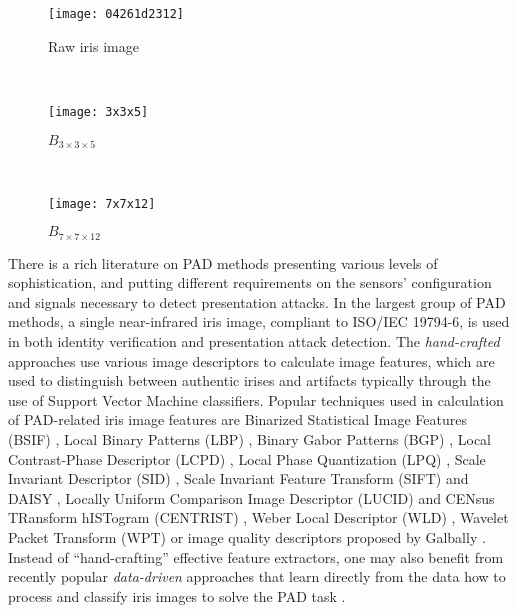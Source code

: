 %
\begin{figure*}[!tb]
    \begin{subfigure}[b]{0.32\linewidth}
            \texttt{[image: 04261d2312]}
        \caption{Raw iris image}
        \label{fig:origimg}
    \end{subfigure}
    ~
    \begin{subfigure}[b]{0.32\linewidth}
        \texttt{[image: 3x3x5]}
        \caption{$B_{3\times 3 \times 5}$}
        \label{fig:bsif3x3}
    \end{subfigure}
    ~
    \begin{subfigure}[b]{0.32\linewidth}
        \centering
        \texttt{[image: 7x7x12]}
        \caption{$B_{7\times 7 \times 12}$}
        \label{fig:bsif7x7}
    \end{subfigure}
    \caption{Examples of different BSIF representations $B_{n\times n \times l}$ (\ref{fig:bsif3x3},\ref{fig:bsif7x7}) of the same image (\ref{fig:origimg}). Note how the structure of the contact lens is highlighted through the different representations.}
    \label{fig:bsif_examples}
\end{figure*}


There is a rich literature on PAD methods presenting various levels of sophistication, and putting different requirements on the sensors' configuration and signals necessary to detect presentation attacks. In the largest group of PAD methods, a single near-infrared iris image, compliant to ISO/IEC 19794-6, is used in both identity verification and presentation attack detection. The \emph{hand-crafted} approaches use various image descriptors to calculate image features, which are used to distinguish between authentic irises and artifacts typically through the use of Support Vector Machine classifiers. Popular techniques used in calculation of PAD-related iris image features are Binarized Statistical Image Features (BSIF) \cite{Komulainen_IJCB_2014}, Local Binary Patterns (LBP) \cite{Doyle_ICB_2013}, Binary Gabor Patterns (BGP) \cite{Lovish_CAIP_2015}, Local Contrast-Phase Descriptor (LCPD) \cite{Gragnaniello_TIFS_2015}, Local Phase Quantization (LPQ) \cite{Sequeira_TSP_2016}, Scale Invariant Descriptor (SID) \cite{Gragnaniello_SITIS_2014}, Scale Invariant Feature Transform (SIFT) and DAISY \cite{Pala_CVPR_2017}, Locally Uniform Comparison Image Descriptor (LUCID) and CENsus TRansform hISTogram (CENTRIST) \cite{Akhtar_AVSS_2014}, Weber Local Descriptor (WLD) \cite{Gragnaniello_TIFS_2015}, Wavelet Packet Transform (WPT) \cite{Chen_PRL_2012} or image quality descriptors proposed by Galbally \etal \cite{Galbally_Handbook_2016}. Instead of ``hand-crafting'' effective feature extractors, one may also benefit from recently popular \emph{data-driven} approaches that learn directly from the data how to process and classify iris images to solve the PAD task  \cite{Silva_SIBGRAPI_2015,Menotti:TIFS:2015,Gragnaniello_SITIS_2016,He_BTAS_2016,Pala_CVPR_2017,Raghavendra_WACV_2017}. 

